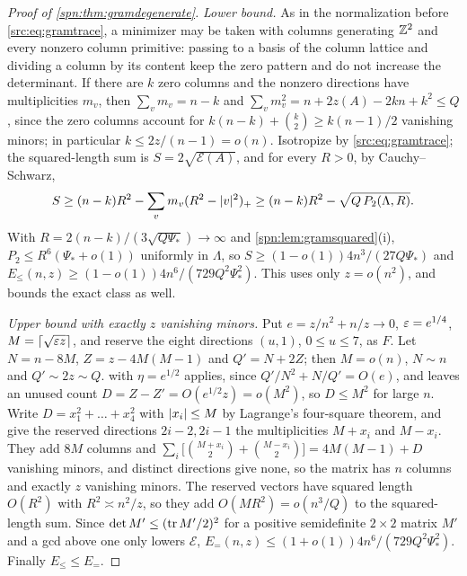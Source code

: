 \begin{proof}[Proof of \cref{spn:thm:gramdegenerate}]
\emph{Lower bound.} As in the normalization before \eqref{src:eq:gramtrace}, a minimizer may be taken with columns
generating $\mathbb{Z}^2$ and every nonzero column primitive: passing to a basis of the column lattice and dividing a
column by its content keep the zero pattern and do not increase the determinant. If there are $k$ zero columns and
the nonzero directions have multiplicities $m_v$, then $\sum_vm_v=n-k$ and
$\sum_vm_v^2=n+2z(A)-2kn+k^2\le Q$, since the zero columns account for $k(n-k)+\binom k2\ge k(n-1)/2$ vanishing
minors; in particular $k\le2z/(n-1)=o(n)$. Isotropize by \eqref{src:eq:gramtrace}; the squared-length sum is
$S=2\sqrt{\mathcal E(A)}$, and for every $R>0$, by Cauchy--Schwarz,
\[
 S\ge(n-k)R^2-\sum_vm_v(R^2-\lvert v\rvert^2)_+\ge(n-k)R^2-\sqrt{Q\,P_2(\Lambda,R)} .
\]
With $R=2(n-k)/(3\sqrt{Q\Psi_*})\to\infty$ and \cref{spn:lem:gramsquared}(i), $P_2\le R^6(\Psi_*+o(1))$ uniformly in
$\Lambda$, so $S\ge(1-o(1))4n^3/(27Q\Psi_*)$ and $E_\le(n,z)\ge(1-o(1))4n^6/(729Q^2\Psi_*^2)$. This uses only
$z=o(n^2)$, and bounds the exact class as well.

\emph{Upper bound with exactly $z$ vanishing minors.} Put $e=z/n^2+n/z\to0$, $\varepsilon=e^{1/4}$, $M=\lceil\sqrt{\varepsilon z}\rceil$, and
reserve the eight directions $(u,1)$, $0\le u\le7$, as $F$. Let $N=n-8M$, $Z=z-4M(M-1)$ and $Q'=N+2Z$; then $M=o(n)$,
$N\sim n$ and $Q'\sim2z\sim Q$.  with $\eta=e^{1/2}$ applies, since
$Q'/N^2+N/Q'=O(e)$, and leaves an unused count $D=Z-Z'=O(e^{1/2}z)=o(M^2)$, so $D\le M^2$ for large $n$. Write
$D=x_1^2+\dots+x_4^2$ with $\lvert x_i\rvert\le M$ by Lagrange's four-square theorem, and give the reserved directions
$2i-2,2i-1$ the multiplicities $M+x_i$ and $M-x_i$. They add $8M$ columns and
$\sum_i\bigl[\binom{M+x_i}2+\binom{M-x_i}2\bigr]=4M(M-1)+D$ vanishing minors, and distinct directions give none, so
the matrix has $n$ columns and exactly $z$ vanishing minors. The reserved vectors have squared length $O(R^2)$ with
$R^2\asymp n^2/z$, so they add $O(MR^2)=o(n^3/Q)$ to the squared-length sum. Since $\det M'\le(\operatorname{tr} M'/2)^2$ for a
positive semidefinite $2\times2$ matrix $M'$ and a gcd above one only lowers $\mathcal E$,
$E_=(n,z)\le(1+o(1))4n^6/(729Q^2\Psi_*^2)$. Finally $E_\le\le E_=$.
\end{proof}

